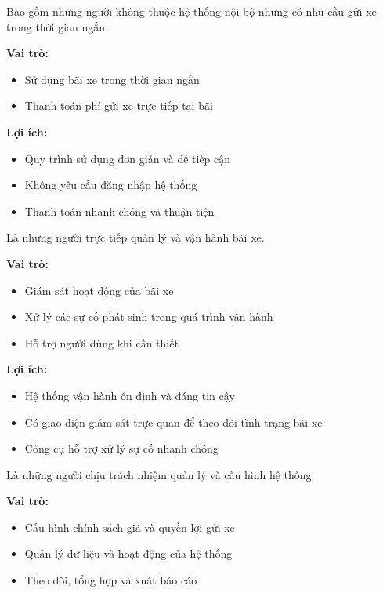 Bao gồm những người không thuộc hệ thống nội bộ nhưng có nhu cầu gửi xe trong thời gian ngắn.

\textbf{Vai trò:}
\begin{itemize}
    \item Sử dụng bãi xe trong thời gian ngắn
    \item Thanh toán phí gửi xe trực tiếp tại bãi
\end{itemize}

\textbf{Lợi ích:}
\begin{itemize}
    \item Quy trình sử dụng đơn giản và dễ tiếp cận
    \item Không yêu cầu đăng nhập hệ thống
    \item Thanh toán nhanh chóng và thuận tiện
\end{itemize}


Là những người trực tiếp quản lý và vận hành bãi xe.

\textbf{Vai trò:}
\begin{itemize}
    \item Giám sát hoạt động của bãi xe
    \item Xử lý các sự cố phát sinh trong quá trình vận hành
    \item Hỗ trợ người dùng khi cần thiết
\end{itemize}

\textbf{Lợi ích:}
\begin{itemize}
    \item Hệ thống vận hành ổn định và đáng tin cậy
    \item Có giao diện giám sát trực quan để theo dõi tình trạng bãi xe
    \item Công cụ hỗ trợ xử lý sự cố nhanh chóng
\end{itemize}


Là những người chịu trách nhiệm quản lý và cấu hình hệ thống.

\textbf{Vai trò:}
\begin{itemize}
    \item Cấu hình chính sách giá và quyền lợi gửi xe
    \item Quản lý dữ liệu và hoạt động của hệ thống
    \item Theo dõi, tổng hợp và xuất báo cáo
\end{itemize}

